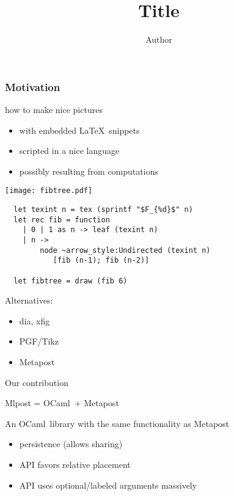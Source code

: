 \documentclass[nodefaultblocks]{beamer}
\title{Title}
\author{Author}
\institute[Proval]{LRI, Proval INRIA Saclay - Île-de-France}
\newcommand{\ocaml}{OCaml}
\newcommand{\metapost}{Metapost}
\begin{document}
\begin{frame}
  
\maketitle

  \bigskip
  \hfill
  \hfill
   \hfill
\end{frame}

\begin{frame}[fragile]\frametitle{Motivation}
  how to make nice pictures
  \begin{itemize}
  \item with embedded \LaTeX\ snippets
  \item scripted in a nice language
  \item possibly resulting from computations
  \end{itemize}
  \begin{overprint}
    \onslide<+>
  \begin{center}
  \bigskip
  \texttt{[image: fibtree.pdf]}
  \end{center}
    \onslide<+>
    \medskip
    \begin{center}
      \medskip
     \begin{verbatim}
  let texint n = tex (sprintf "$F_{%d}$" n)
  let rec fib = function
    | 0 | 1 as n -> leaf (texint n)
    | n -> 
        node ~arrow_style:Undirected (texint n) 
           [fib (n-1); fib (n-2)]

  let fibtree = draw (fib 6)

      \end{verbatim}
    \end{center}
    \onslide<+>
    \medskip
    Alternatives: 
    \begin{itemize}
    \item dia, xfig
    \item PGF/Tikz 
    \item Metapost
    \end{itemize}
  \end{overprint}
\end{frame}

\begin{frame}{Our contribution}

  Mlpost = \ocaml\ + \metapost

  \bigskip
  An \ocaml\ library with the same functionality as \metapost

  \bigskip
  \begin{itemize}
  \item persistence (allows sharing) 
  \item API favors relative placement
  \item API uses optional/labeled arguments massively
  \end{itemize}
  
\end{frame}
\end{document}
